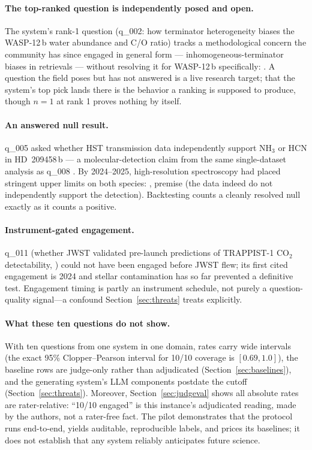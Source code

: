 \paragraph{The top-ranked question is independently posed and open.}
The system's rank-1 question (q\_002: how terminator heterogeneity
biases the WASP-12\,b water abundance and C/O ratio) tracks a
methodological concern the community has since engaged in general form
--- inhomogeneous-terminator biases in retrievals --- without resolving
it for WASP-12\,b specifically: . A question
the field poses but has not answered is a live research target; that the
system's top pick lands there is the behavior a ranking is supposed to
produce, though $n=1$ at rank 1 proves nothing by itself.

\paragraph{An answered null result.} q\_005 asked whether HST
transmission data independently support NH$_3$ or HCN in HD~209458\,b
--- a molecular-detection claim from the same single-dataset analysis as
q\_008 \citep{macdonald2017}. By 2024--2025, high-resolution
spectroscopy had placed stringent upper limits on both species:
, premise  (the data indeed do
not independently support the detection). Backtesting counts a
cleanly resolved null exactly as it counts a positive.

\paragraph{Instrument-gated engagement.} q\_011 (whether JWST validated
pre-launch predictions of TRAPPIST-1 CO$_2$ detectability,
\citealp{lustigyaeger2019}) could not have been engaged before JWST flew;
its first cited engagement is 2024 and stellar contamination has so far
prevented a definitive test. Engagement timing is partly an instrument
schedule, not purely a question-quality signal---a confound
Section~\ref{sec:threats} treats explicitly.

\paragraph{What these ten questions do not show.} With ten questions
from one system in one domain, rates carry wide intervals (the exact
95\% Clopper--Pearson interval for 10/10 coverage is $[0.69, 1.0]$),
the baseline rows are judge-only rather than adjudicated
(Section~\ref{sec:baselines}), and the generating system's LLM
components postdate the cutoff (Section~\ref{sec:threats}). Moreover,
Section~\ref{sec:judgeval} shows all absolute rates are
rater-relative: ``10/10 engaged'' is this instance's adjudicated
reading, made by the authors, not a rater-free fact. The pilot
demonstrates that the protocol runs end-to-end, yields auditable,
reproducible labels, and prices its baselines; it does not establish
that any system reliably anticipates future science.

